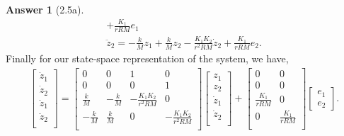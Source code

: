 \documentclass{article}
\theoremstyle{definition}
\newtheorem*{ans}{Answer}
\begin{document}
\begin{ans}[2.5a]
\begin{align*}
            + \frac{K_1}{rRM} e_1
            \\
            \ddot z_2 = - \frac{k}{M} z_1 + \frac{k}{M}z_2 
            - \frac{K_1 K_2}{r^2 R M}\dot z_2 
            + \frac{K_1}{rRM} e_2.
        \end{align*}
        Finally for our state-space representation of the system, we have,
        \begin{align*}
            \begin{bmatrix}
                \dot z_1 \\
                \dot z_2 \\
                \ddot z_1 \\
                \ddot z_2 \\
            \end{bmatrix}
            =
            \begin{bmatrix}
                0 & 0 & 1 & 0 \\
                0 & 0 & 0 & 1 \\
                \frac{k}{M} & -\frac{k}{M} & -\frac{K_1 K_2}{r^2 R M} & 0 \\
                -\frac{k}{M} & \frac{k}{M} &  0 & -\frac{K_1 K_2}{r^2 R M} \\
            \end{bmatrix}
            \begin{bmatrix}
                z_1 \\
                z_2 \\
                \dot z_1 \\
                \dot z_2 \\
            \end{bmatrix}
            +
            \begin{bmatrix}
                0 & 0 \\
                0 & 0 \\
                \frac{K_1}{rRM} & 0 \\
                0 & \frac{K_1}{rRM} \\
            \end{bmatrix}
            \begin{bmatrix}
                e_1 \\ e_2
            \end{bmatrix}
            .
        \end{align*}
    \end{ans}
    \newpage
\end{document}
